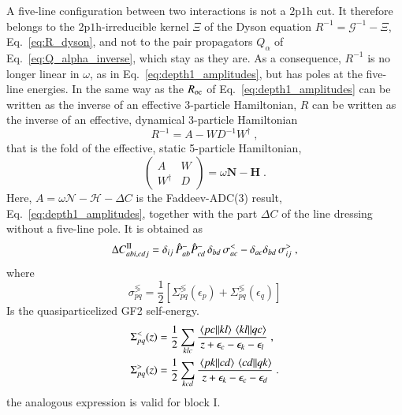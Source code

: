 \documentclass[aip,jcp,reprint,noshowkeys,superscriptaddress]{revtex4-1}
\newcommand{\eps}{\epsilon}
\newcommand{\pph}{\text{2p1h}}
\begin{document}
A five-line configuration between two interactions is not a $\pph$ cut.
It therefore belongs to the $\pph$-irreducible kernel $\Xi$ of the Dyson
equation $R^{-1}=\mathcal G^{-1}-\Xi$, Eq.~\eqref{eq:R_dyson}, and not to
the pair propagators $Q_\alpha$ of Eq.~\eqref{eq:Q_alpha_inverse}, which
stay as they are. As a consequence, $R^{-1}$ is no longer linear in
$\omega$, as in Eq.~\eqref{eq:depth1_amplitudes}, but has poles at the
five-line energies.
In the same way as the $R_{\rm oc}$ of Eq.~\eqref{eq:depth1_amplitudes}
can be written as the inverse of an
effective 3-particle Hamiltonian, $R$ can be written as the inverse of an
effective, dynamical 3-particle Hamiltonian
\begin{equation}
	\label{eq:Q_alpha_Schur}
R^{-1}
= A-W D^{-1}W^\dagger \;,
\end{equation}
that is the fold of the
effective, static 5-particle Hamiltonian,
\begin{equation}
\begin{pmatrix}A&W\\W^\dagger&D\end{pmatrix}
=
\omega\mathbf N-\mathbf H \;.
\label{eq:pencil_F4}
\end{equation}
Here, $A=\omega\mathcal N-\mathcal H-\Delta C$ is the Faddeev-ADC(3) result,
Eq.~\eqref{eq:depth1_amplitudes}, together with the part $\Delta C$ of the
line dressing without a five-line pole.
It is obtained as
\begin{equation}
	\label{eq:Delta_C}
\Delta C^{\rm II}_{abi,cdj}
=
\delta_{ij}\,\hat P^-_{ab}\hat P^-_{cd}\,\delta_{bd}\,\sigma^<_{ac}
-\delta_{ac}\delta_{bd}\,\sigma^>_{ij} \;,
\end{equation}
where 
\begin{equation}
\sigma^\lessgtr_{pq}=
\frac12[\Sigma^\lessgtr_{pq}(\eps_p)+\Sigma^\lessgtr_{pq}(\eps_q)]
\end{equation}
Is the quasiparticelized GF2 self-energy.
\begin{equation}
\begin{aligned}
\Sigma^{<}_{pq}(z)
={}&
\frac12\sum_{klc}\frac{\mel{pc}{}{kl}\mel{kl}{}{qc}}{z+\eps_c-\eps_k-\eps_l} \;,
\\
\Sigma^{>}_{pq}(z)
={}&
\frac12\sum_{kcd}\frac{\mel{pk}{}{cd}\mel{cd}{}{qk}}{z+\eps_k-\eps_c-\eps_d} \;.
\end{aligned}
\nonumber
\end{equation}
the analogous expression is valid for block I.
\end{document}
